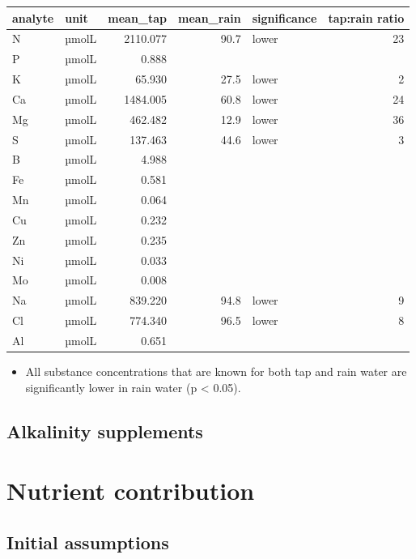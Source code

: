\documentclass[
]{article}
\providecommand{\tightlist}{%
  \setlength{\itemsep}{0pt}\setlength{\parskip}{0pt}}
\begin{document}
\begin{longtable}[]{@{}llrrlr@{}}
\toprule\noalign{}
analyte & unit & mean\_tap & mean\_rain & significance & tap:rain
ratio \\
\midrule\noalign{}
\endhead
\bottomrule\noalign{}
\endlastfoot
N & µmolL & 2110.077 & 90.7 & lower & 23 \\
P & µmolL & 0.888 & & & \\
K & µmolL & 65.930 & 27.5 & lower & 2 \\
Ca & µmolL & 1484.005 & 60.8 & lower & 24 \\
Mg & µmolL & 462.482 & 12.9 & lower & 36 \\
S & µmolL & 137.463 & 44.6 & lower & 3 \\
B & µmolL & 4.988 & & & \\
Fe & µmolL & 0.581 & & & \\
Mn & µmolL & 0.064 & & & \\
Cu & µmolL & 0.232 & & & \\
Zn & µmolL & 0.235 & & & \\
Ni & µmolL & 0.033 & & & \\
Mo & µmolL & 0.008 & & & \\
Na & µmolL & 839.220 & 94.8 & lower & 9 \\
Cl & µmolL & 774.340 & 96.5 & lower & 8 \\
Al & µmolL & 0.651 & & & \\
\end{longtable}

\begin{itemize}
\tightlist
\item
  All substance concentrations that are known for both tap and rain
  water are significantly lower in rain water (p \textless{} 0.05).
\end{itemize}

\hypertarget{alkalinity-supplements-1}{%
\subsection{Alkalinity supplements}\label{alkalinity-supplements-1}}

\newpage

\hypertarget{nutrient-contribution}{%
\section{Nutrient contribution}\label{nutrient-contribution}}

\hypertarget{initial-assumptions}{%
\subsection{Initial assumptions}\label{initial-assumptions}}
\end{document}
